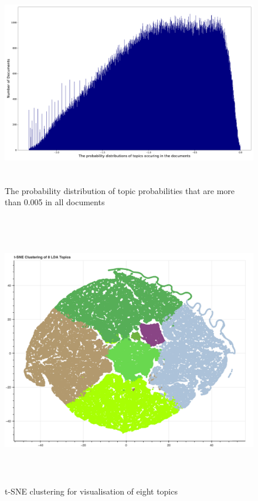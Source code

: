 \begin{figure}[H]
    \centering
    \includegraphics[width = 16cm, height = 9cm]{./img/distri_doc_word_counts_after_cut.pdf}
    \caption[The probability distribution of topic probabilities after cut small probabilities]{The probability distribution of topic probabilities that are more than 0.005 in all documents}
\end{figure}

\begin{figure}[H]
    \centering
    \includegraphics[width = 16cm, height = 12cm]{./img/t-sne.png}
    \caption{t-SNE clustering for visualisation of eight topics}
\end{figure}

